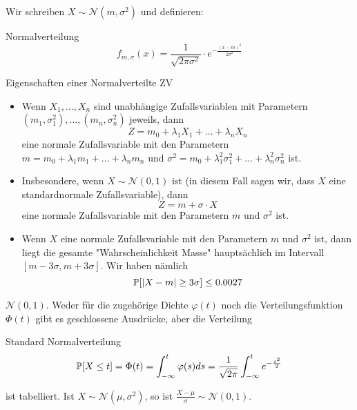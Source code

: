  Wir schreiben $X \sim \mathcal{N}(m, \sigma^2)$ und definieren:
\begin{mainbox}{Normalverteilung}
    $$f_{m, \sigma}(x) = \frac{1}{\sqrt{2 \pi \sigma^2}} \cdot e^{-\frac{(x-m)^2}{2 \sigma^2}}$$
\end{mainbox}

\begin{subbox}{Eigenschaften einer Normalverteilte ZV}
    \begin{itemize}
        \item Wenn $X_1, \ldots , X_n$ sind unabhängige Zufallsvariablen mit Parametern $(m_1, \sigma^2_1), \ldots, (m_n, \sigma^2_n)$
        jeweils, dann
        $$Z = m_0 + \lambda_1X_1 + \ldots + \lambda_nX_n$$
        eine normale Zufallsvariable mit den Parametern $m = m_0 + \lambda_1m_1 + \ldots + \lambda_nm_n$ und $\sigma^2 = m_0 + \lambda^2_1\sigma^2_1 + \ldots + \lambda^2_n\sigma^2_n$ ist.
        \item Insbesondere, wenn $X \sim \mathcal{N}(0, 1)$ ist (in diesem Fall sagen wir, dass $X$ eine standardnormale
        Zufallsvariable), dann $$Z = m + \sigma \cdot X$$
        eine normale Zufallsvariable mit den Parametern $m$ und $\sigma^2$ ist.
        \item Wenn $X$ eine normale Zufallsvariable mit den Parametern $m$ und $\sigma^2$ ist, dann liegt die gesamte "Wahrscheinlichkeit
        Masse" hauptsächlich im Intervall $[m - 3\sigma, m + 3\sigma]$. Wir haben nämlich
        $$\mathbb{P}[ |X - m| \geq 3\sigma] \leq 0.0027$$
    \end{itemize}
\end{subbox}


 $\mathcal{N}(0,1)$. Weder für die zugehörige Dichte $\varphi(t)$ noch die Verteilungsfunktion $\Phi(t)$ gibt es geschlossene Ausdrücke, aber die Verteilung
\begin{mainbox}{Standard Normalverteilung}
    $$\mathbb{P}[X \leq t] = \Phi(t) = \int_{-\infty}^t \varphi(s)ds = \frac{1}{\sqrt{2 \pi}} \int_{-\infty}^t e^{-\frac{s^2}{2}}$$
\end{mainbox}


ist tabelliert. Ist $X \sim \mathcal{N}(\mu,\sigma^2)$, so ist $\frac{X - \mu}{\sigma} \sim \mathcal{N}(0,1)$.

\columnbreak